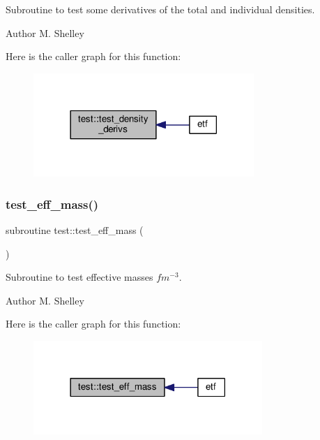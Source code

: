 Subroutine to test some derivatives of the total and individual densities. 

\begin{DoxyAuthor}{Author}
M. Shelley 
\end{DoxyAuthor}
Here is the caller graph for this function\+:
\nopagebreak
\begin{figure}[H]
\begin{center}
\leavevmode
\includegraphics[width=237pt]{namespacetest_a50469f436f9c4caa447dafc48e311558_icgraph}
\end{center}
\end{figure}
\mbox{\label{namespacetest_ac49b81619b874cdd8276af19d24675cc}} 
\subsubsection{\texorpdfstring{test\+\_\+eff\+\_\+mass()}{test\_eff\_mass()}}
{\footnotesize\ttfamily subroutine test\+::test\+\_\+eff\+\_\+mass (\begin{DoxyParamCaption}{ }\end{DoxyParamCaption})}



Subroutine to test effective masses $fm^{-3}$. 

\begin{DoxyAuthor}{Author}
M. Shelley 
\end{DoxyAuthor}
Here is the caller graph for this function\+:
\nopagebreak
\begin{figure}[H]
\begin{center}
\leavevmode
\includegraphics[width=246pt]{namespacetest_ac49b81619b874cdd8276af19d24675cc_icgraph}
\end{center}
\end{figure}
\mbox{\label{namespacetest_a377babe07d6ab6f0791233afee079582}} 
